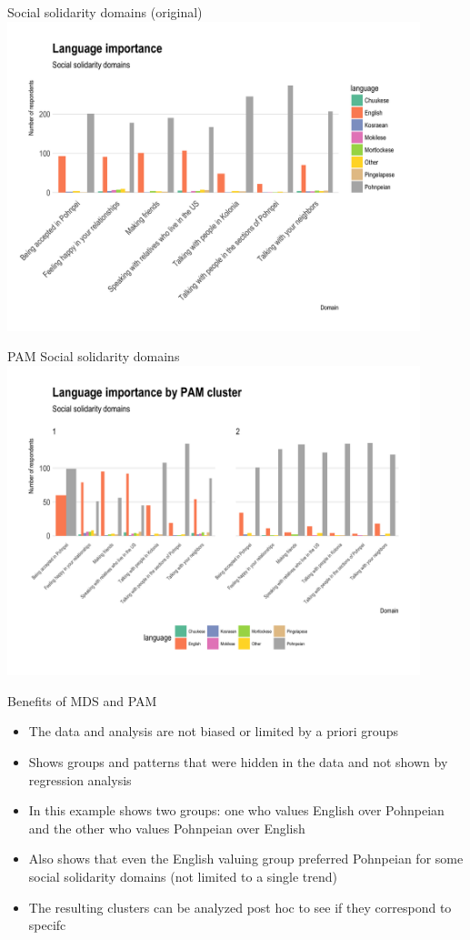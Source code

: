 \documentclass[10pt]{beamer}
\begin{document}
\begin{frame}{Social solidarity domains (original)}
\includegraphics[width=0.9\textwidth]{figures/socialsolidaritydomains.png}
\end{frame}

\begin{frame}{PAM Social solidarity domains}
\includegraphics[width=0.9\textwidth]{figures/PAMsocialsolidaritydomains.png}
\end{frame}


\begin{frame}{Benefits of MDS and PAM}
\begin{itemize}
\item The data and analysis are not biased or limited by a priori groups
\item Shows groups and patterns that were hidden in the data and not shown by regression analysis
\item In this example shows two groups: one who values English over Pohnpeian and the other who values Pohnpeian over English
\item Also shows that even the English valuing group preferred Pohnpeian for some social solidarity domains (not limited to a single trend)
\item The resulting clusters can be analyzed post hoc to see if they correspond to specifc 
\end{itemize}
\end{frame}
\end{document}
